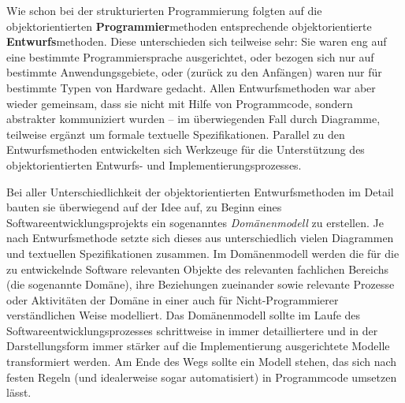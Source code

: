 Wie schon bei der strukturierten Programmierung folgten auf die objektorientierten \textbf{Programmier}methoden entsprechende objektorientierte \textbf{Entwurfs}methoden. Diese unterschieden sich teilweise sehr: Sie waren eng auf eine bestimmte Programmiersprache ausgerichtet, oder bezogen sich nur auf bestimmte Anwendungsgebiete, oder (zurück zu den Anfängen) waren nur für bestimmte Typen von Hardware gedacht. Allen Entwurfsmethoden war aber wieder gemeinsam, dass sie nicht mit Hilfe von Programmcode, sondern abstrakter kommuniziert wurden – im überwiegenden Fall durch Diagramme, teilweise ergänzt um formale textuelle Spezifikationen. Parallel zu den Entwurfsmethoden entwickelten sich Werkzeuge für die Unterstützung des objektorientierten Entwurfs- und Implementierungsprozesses. 

Bei aller Unterschiedlichkeit der objektorientierten Entwurfsmethoden im Detail bauten sie überwiegend auf der Idee auf, zu Beginn eines Softwareentwicklungsprojekts ein sogenanntes \textit{Domänenmodell} 
zu erstellen. Je nach Entwurfsmethode setzte sich dieses aus unterschiedlich vielen Diagrammen und textuellen Spezifikationen zusammen. Im Domänenmodell werden die für die zu entwickelnde Software relevanten Objekte des relevanten fachlichen Bereichs (die sogenannte Domäne), ihre Beziehungen zueinander sowie relevante Prozesse oder Aktivitäten der Domäne in einer auch für Nicht-Programmierer verständlichen Weise modelliert. Das Domänenmodell sollte im Laufe des Softwareentwicklungsprozesses schrittweise in immer detailliertere und in der Darstellungsform immer stärker auf die Implementierung ausgerichtete Modelle transformiert werden. Am Ende des Wegs sollte ein Modell stehen, das sich nach festen Regeln (und idealerweise sogar  automatisiert) in Programmcode umsetzen lässt. 

